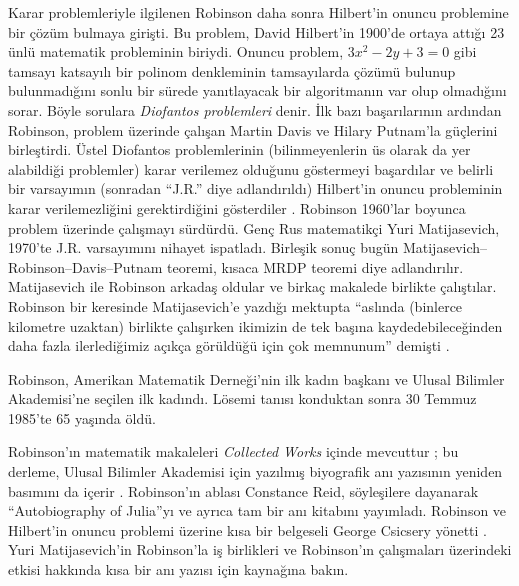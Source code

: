 Karar problemleriyle ilgilenen Robinson daha sonra Hilbert'in onuncu
problemine bir çözüm bulmaya girişti. Bu problem, David Hilbert'in 1900'de
ortaya attığı 23 ünlü matematik probleminin biriydi. Onuncu problem, $3x^2 -
2y +3 = 0$ gibi tamsayı katsayılı bir polinom denkleminin tamsayılarda çözümü
bulunup bulunmadığını sonlu bir sürede yanıtlayacak bir algoritmanın var olup
olmadığını sorar. Böyle sorulara \emph{Diofantos problemleri} denir. İlk bazı
başarılarının ardından Robinson, problem üzerinde çalışan Martin Davis ve
Hilary Putnam'la güçlerini birleştirdi. Üstel Diofantos problemlerinin
(bilinmeyenlerin üs olarak da yer alabildiği problemler) karar verilemez
olduğunu göstermeyi başardılar ve belirli bir varsayımın (sonradan ``J.R.''
diye adlandırıldı) Hilbert'in onuncu probleminin karar verilemezliğini
gerektirdiğini gösterdiler \citep{DavisPutnamRobinson1961}. Robinson 1960'lar
boyunca problem üzerinde çalışmayı sürdürdü. Genç Rus matematikçi Yuri
Matijasevich, 1970'te J.R. varsayımını nihayet ispatladı. Birleşik sonuç bugün
Matijasevich--Robinson--Davis--Putnam teoremi, kısaca MRDP teoremi diye
adlandırılır. Matijasevich ile Robinson arkadaş oldular ve birkaç makalede
birlikte çalıştılar. Robinson bir keresinde Matijasevich'e yazdığı mektupta
``aslında (binlerce kilometre uzaktan) birlikte çalışırken ikimizin de tek
başına kaydedebileceğinden daha fazla ilerlediğimiz açıkça görüldüğü için çok
memnunum'' demişti \citep[45]{Matijasevich1992}.

Robinson, Amerikan Matematik Derneği'nin ilk kadın başkanı ve Ulusal Bilimler
Akademisi'ne seçilen ilk kadındı. Lösemi tanısı konduktan sonra 30 Temmuz
1985'te 65 yaşında öldü.

\begin{reading}
Robinson'ın matematik makaleleri \textit{Collected Works} içinde mevcuttur
\citep{Robinson1996}; bu derleme, Ulusal Bilimler Akademisi için yazılmış
biyografik anı yazısının yeniden basımını da içerir \citep{Feferman1994}.
Robinson'ın
ablası Constance Reid, söyleşilere dayanarak ``Autobiography of Julia''yı
\citep{Reid1986} ve ayrıca tam bir anı kitabını \citep{Reid1996} yayımladı.
Robinson ve Hilbert'in onuncu problemi üzerine kısa bir belgeseli George
Csicsery yönetti \citep{Csicsery2016}. Yuri Matijasevich'in Robinson'la iş
birlikleri ve Robinson'ın çalışmaları üzerindeki etkisi hakkında kısa bir anı
yazısı için \citep{Matijasevich1992} kaynağına bakın.
\end{reading}

